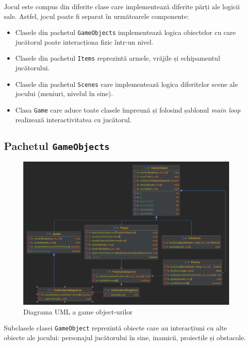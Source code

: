 \documentclass{article}
\begin{document}
    Jocul este compus din diferite clase care implementează diferite părți ale logicii sale. Astfel,
    jocul poate fi separat în următoarele componente:
    \begin{itemize}
        \item Clasele din pachetul \texttt{GameObjects} implementează logica obiectelor cu care
        jucătorul poate interacționa fizic într-un nivel.
        \item Clasele din pachetul \texttt{Items} reprezintă armele, vrăjile și echipamentul
        jucătorului.
        \item Clasele din pachetul \texttt{Scenes} care implementează logica diferitelor scene ale
        jocului (meniuri, nivelul în sine).
        \item Clasa \texttt{Game} care aduce toate clasele împreună și folosind șablonul
        \emph{main loop} realizează interactivitatea cu jucătorul.
    \end{itemize}

    \subsection{Pachetul \texttt{GameObjects}}
    \begin{figure}[H]
        \includegraphics[width=\linewidth]{gameobjects-diagram}
        \centering
        \caption{Diagrama UML a game object-urilor}
    \end{figure}

    Subclasele clasei \texttt{GameObject} reprezintă obiecte care au interacțiuni cu alte obiecte
    ale jocului: personajul jucătorului în sine, inamicii, proiectile și obstacole.
\end{document}
